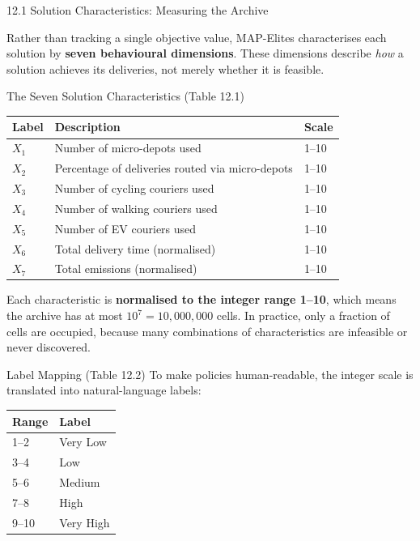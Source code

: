 \documentclass[aspectratio=169,10pt]{beamer}
\begin{document}
\begin{frame}[allowframebreaks]{12.1 Solution Characteristics: Measuring the Archive}

Rather than tracking a single objective value, MAP-Elites characterises
each solution by \textbf{seven behavioural dimensions}.
These dimensions describe \emph{how} a solution achieves its deliveries,
not merely whether it is feasible.

\medskip

\begin{block}{The Seven Solution Characteristics (Table 12.1)}
  \begin{tabular}{lll}
    \toprule
    \textbf{Label} & \textbf{Description} & \textbf{Scale} \\
    \midrule
    $X_1$ & Number of micro-depots used & 1--10 \\
    $X_2$ & Percentage of deliveries routed via micro-depots & 1--10 \\
    $X_3$ & Number of cycling couriers used & 1--10 \\
    $X_4$ & Number of walking couriers used & 1--10 \\
    $X_5$ & Number of EV couriers used & 1--10 \\
    $X_6$ & Total delivery time (normalised) & 1--10 \\
    $X_7$ & Total emissions (normalised) & 1--10 \\
    \bottomrule
  \end{tabular}
\end{block}

\medskip

Each characteristic is \textbf{normalised to the integer range 1--10},
which means the archive has at most $10^7 = 10{,}000{,}000$ cells.
In practice, only a fraction of cells are occupied, because many
combinations of characteristics are infeasible or never discovered.

\medskip

\begin{block}{Label Mapping (Table 12.2)}
  To make policies human-readable, the integer scale is translated
  into natural-language labels:
  \begin{tabular}{ll}
    \toprule
    \textbf{Range} & \textbf{Label} \\
    \midrule
    1--2 & Very Low \\
    3--4 & Low \\
    5--6 & Medium \\
    7--8 & High \\
    9--10 & Very High \\
    \bottomrule
  \end{tabular}
\end{block}


\end{frame}
\end{document}
